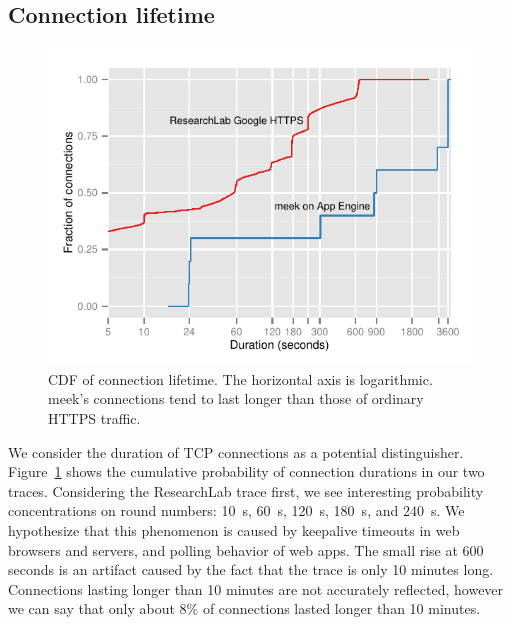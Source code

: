 \documentclass[conference]{IEEEtran}
\newcommand{\meek}{meek\xspace}
\newcommand{\lbl}{ResearchLab\xspace}
\begin{document}
\subsection{Connection lifetime}

\begin{figure}
\centering
\includegraphics[width=\linewidth]{flowduration}
\caption{
CDF of connection lifetime.
The horizontal axis is logarithmic.
\meek's connections tend to last longer than those of ordinary HTTPS traffic.
}
\label{fig:duration}
\end{figure}


We consider the duration of TCP connections as a potential distinguisher.
Figure~\ref{fig:duration} shows the cumulative probability
of connection durations in our two traces.
Considering the \lbl trace first,
we see interesting probability concentrations on
round numbers: 10~s, 60~s, 120~s, 180~s, and 240~s.
We hypothesize that this phenomenon is caused by
keepalive timeouts in web browsers and servers,
and polling behavior of web apps.
The small rise at 600 seconds is an artifact caused
by the fact that the trace is only 10 minutes long.
Connections lasting longer than 10 minutes are not accurately reflected,
however we can say that only about 8\% of connections lasted longer than 10 minutes.
\end{document}
